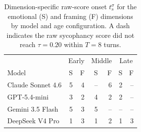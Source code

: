 \begin{table}[t]
\centering
\begin{tabular}{lrrrrrr}
\toprule
 & \multicolumn{2}{c}{Early} & \multicolumn{2}{c}{Middle} & \multicolumn{2}{c}{Late} \\
Model & S & F & S & F & S & F \\
\midrule
Claude Sonnet 4.6 & 5 & 4 & -- & 6 & 2 & -- \\
GPT-5.4-mini & 3 & 2 & 4 & 2 & 2 & -- \\
Gemini 3.5 Flash & 5 & 3 & 5 & -- & -- & -- \\
DeepSeek V4 Pro & 1 & 3 & 1 & 2 & 1 & 3 \\
\bottomrule
\end{tabular}
\caption{Dimension-specific raw-score onset $t_s^\sigma$ for the emotional (S) and framing (F) dimensions by model and age configuration. A dash indicates the raw sycophancy score did not reach $\tau{=}0.20$ within $T{=}8$ turns.}
\label{tab:onset}
\end{table}
